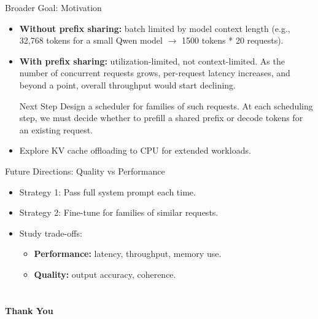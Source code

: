 \documentclass[Serif, 10pt, brown]{beamer}
\theoremstyle{example}
\theoremstyle{plain}
\begin{document}
\begin{frame}{Broader Goal: Motivation}
\begin{itemize}
    \item \textbf{Without prefix sharing:} batch limited by model context length (e.g., 32,768 tokens for a small Qwen model $\rightarrow$ 1500 tokens * 20 requests).
    \item \textbf{With prefix sharing:} utilization-limited, not context-limited. As the number of concurrent requests grows, per-request latency increases, and beyond a point, overall throughput would start declining.
    \begin{block}{Next Step}
    Design a scheduler for families of such requests. At each scheduling step, we must decide whether to prefill a shared prefix or decode tokens for an existing request.
    \end{block}
    \item Explore KV cache offloading to CPU for extended workloads.
\end{itemize}
\end{frame}

\begin{frame}{Future Directions: Quality vs Performance}
\begin{itemize}
    \item Strategy 1: Pass full system prompt each time.
    \item Strategy 2: Fine-tune for families of similar requests.
    \item Study trade-offs:
    \begin{itemize}
        \item \textbf{Performance:} latency, throughput, memory use.
        \item \textbf{Quality:} output accuracy, coherence.
    \end{itemize}
\end{itemize}
\end{frame}

\section{}
\begin{frame}
    \Huge{\centerline{\bf Thank You}}
\end{frame}
\end{document}
